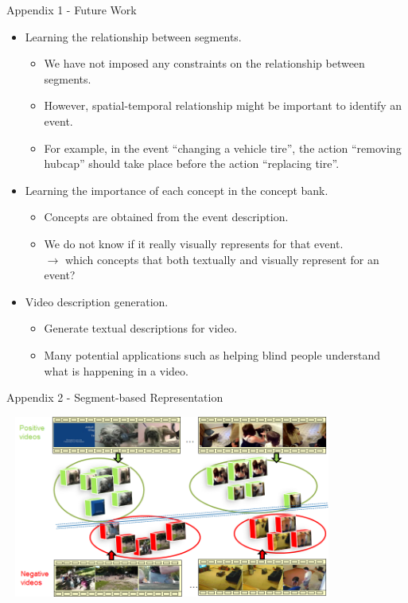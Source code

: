 \documentclass{beamer}
\begin{document}
\begin{frame}{Appendix 1 - Future Work} 	
	
\begin{itemize}
	\item Learning the relationship between segments.
	\begin{itemize}
		\item We have not imposed any constraints on the relationship between segments.
		\item However, spatial-temporal relationship might
		be important to identify an event. 
		\item For example, in the event ``changing a vehicle tire'',
		the action ``removing hubcap'' should take place before the action ``replacing tire''.
	\end{itemize}
	\item Learning the importance of each concept in the concept bank.
	\begin{itemize}
		\item Concepts are obtained from the event description.
		\item We do not know if it really visually represents for that event.
		\\
		$\rightarrow$ which	concepts that both textually and visually represent for an event?	
	\end{itemize}
	\item Video description generation.
	\begin{itemize}
		\item Generate textual descriptions for video.
		\item Many potential applications such as helping blind people understand what is happening in a video.
	\end{itemize}
\end{itemize}
	
\end{frame}	

\begin{frame}{Appendix 2 - Segment-based Representation} 	
	
	\begin{center}
		\includegraphics[width=11cm,height=6cm]{images/part4/segmentbased.png}
	\end{center}
	
\end{frame}	
\end{document}
